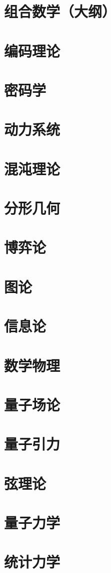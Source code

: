 \documentclass[UTF8]{NatureUniverse}
\begin{document}
\section{组合数学（大纲）}
\section{编码理论}
\section{密码学}
\section{动力系统}
\section{混沌理论}
\section{分形几何}
\section{博弈论}
\section{图论}
\section{信息论}
\section{数学物理}
\section{量子场论}
\section{量子引力}
\section{弦理论}
\section{量子力学}
\section{统计力学}
\end{document}
